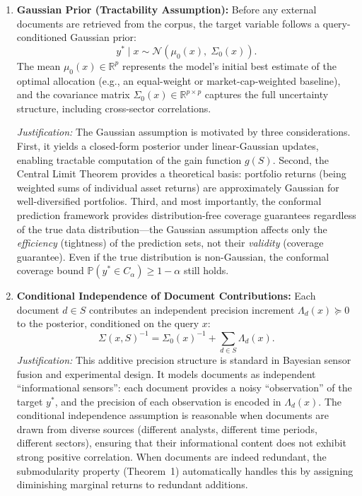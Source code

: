 \documentclass[12pt,a4paper,oneside]{report}
\theoremstyle{definition}
\theoremstyle{remark}
\begin{document}
\begin{enumerate}[leftmargin=2em]
  \item \textbf{Gaussian Prior (Tractability Assumption):} Before any external documents are retrieved from the corpus, the target variable follows a query-conditioned Gaussian prior:
  \[
  y^* \mid x \sim \mathcal{N}(\mu_0(x),\; \Sigma_0(x)).
  \]
  The mean $\mu_0(x) \in \mathbb{R}^p$ represents the model's initial best estimate of the optimal allocation (e.g., an equal-weight or market-cap-weighted baseline), and the covariance matrix $\Sigma_0(x) \in \mathbb{R}^{p \times p}$ captures the full uncertainty structure, including cross-sector correlations.

  \textit{Justification:} The Gaussian assumption is motivated by three considerations. First, it yields a closed-form posterior under linear-Gaussian updates, enabling tractable computation of the gain function $g(S)$. Second, the Central Limit Theorem provides a theoretical basis: portfolio returns (being weighted sums of individual asset returns) are approximately Gaussian for well-diversified portfolios. Third, and most importantly, the conformal prediction framework provides distribution-free coverage guarantees regardless of the true data distribution---the Gaussian assumption affects only the \emph{efficiency} (tightness) of the prediction sets, not their \emph{validity} (coverage guarantee). Even if the true distribution is non-Gaussian, the conformal coverage bound $\mathbb{P}(y^* \in C_{\alpha}) \geq 1 - \alpha$ still holds.

  \item \textbf{Conditional Independence of Document Contributions:} Each document $d \in S$ contributes an independent precision increment $\Lambda_d(x) \succeq 0$ to the posterior, conditioned on the query $x$:
  \[
  \Sigma(x, S)^{-1} = \Sigma_0(x)^{-1} + \sum_{d \in S} \Lambda_d(x).
  \]
  \textit{Justification:} This additive precision structure is standard in Bayesian sensor fusion and experimental design. It models documents as independent ``informational sensors'': each document provides a noisy ``observation'' of the target $y^*$, and the precision of each observation is encoded in $\Lambda_d(x)$. The conditional independence assumption is reasonable when documents are drawn from diverse sources (different analysts, different time periods, different sectors), ensuring that their informational content does not exhibit strong positive correlation. When documents are indeed redundant, the submodularity property (Theorem~1) automatically handles this by assigning diminishing marginal returns to redundant additions.
\end{enumerate}
\end{document}
